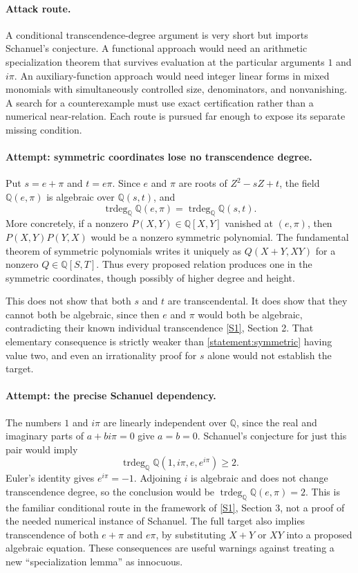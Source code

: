 \documentclass[11pt,a4paper]{article}
\newcommand{\Q}{\mathbb{Q}}
\newcommand{\sref}[2]{\hyperlink{source:#1:#2}{[S#2]}}
\numberwithin{equation}{section}
\begin{document}
\paragraph{Attack route.}
A conditional transcendence-degree argument is very short but imports
Schanuel's conjecture. A functional approach would need an arithmetic
specialization theorem that survives evaluation at the particular
arguments $1$ and $i\pi$. An auxiliary-function approach would need
integer linear forms in mixed monomials with simultaneously controlled
size, denominators, and nonvanishing. A search for a counterexample must
use exact certification rather than a numerical near-relation. Each
route is pursued far enough to expose its separate missing condition.

\paragraph{Attempt: symmetric coordinates lose no transcendence degree.}
Put $s=e+\pi$ and $t=e\pi$. Since $e$ and $\pi$ are roots of
$Z^2-sZ+t$, the field $\Q(e,\pi)$ is algebraic over $\Q(s,t)$, and
\begin{equation}\label{statement:symmetric}
 \operatorname{trdeg}_{\Q}\Q(e,\pi)
 =\operatorname{trdeg}_{\Q}\Q(s,t).
\end{equation}
More concretely, if a nonzero $P(X,Y)\in\Q[X,Y]$ vanished at $(e,\pi)$,
then $P(X,Y)P(Y,X)$ would be a nonzero symmetric polynomial. The
fundamental theorem of symmetric polynomials writes it uniquely as
$Q(X+Y,XY)$ for a nonzero $Q\in\Q[S,T]$. Thus every proposed relation
produces one in the symmetric coordinates, though possibly of higher
degree and height.

This does not show that both $s$ and $t$ are transcendental. It does
show that they cannot both be algebraic, since then $e$ and $\pi$ would
both be algebraic, contradicting their known individual transcendence
\sref{statement}{1}, Section 2. That elementary consequence is strictly weaker
than \eqref{statement:symmetric} having value two, and even an irrationality
proof for $s$ alone would not establish the target.

\paragraph{Attempt: the precise Schanuel dependency.}
The numbers $1$ and $i\pi$ are linearly independent over $\Q$, since
the real and imaginary parts of $a+bi\pi=0$ give $a=b=0$. Schanuel's
conjecture for just this pair would imply
\begin{equation}
 \operatorname{trdeg}_{\Q}\Q(1,i\pi,e,e^{i\pi})\geq2.
\end{equation}
Euler's identity gives $e^{i\pi}=-1$. Adjoining $i$ is algebraic and
does not change transcendence degree, so the conclusion would be
$\operatorname{trdeg}_{\Q}\Q(e,\pi)=2$. This is the familiar conditional
route in the framework of \sref{statement}{1}, Section 3, not a proof of the
needed numerical instance of Schanuel. The full target also implies
transcendence of both $e+\pi$ and $e\pi$, by substituting $X+Y$ or $XY$
into a proposed algebraic equation. These consequences are useful
warnings against treating a new ``specialization lemma'' as innocuous.
\end{document}

